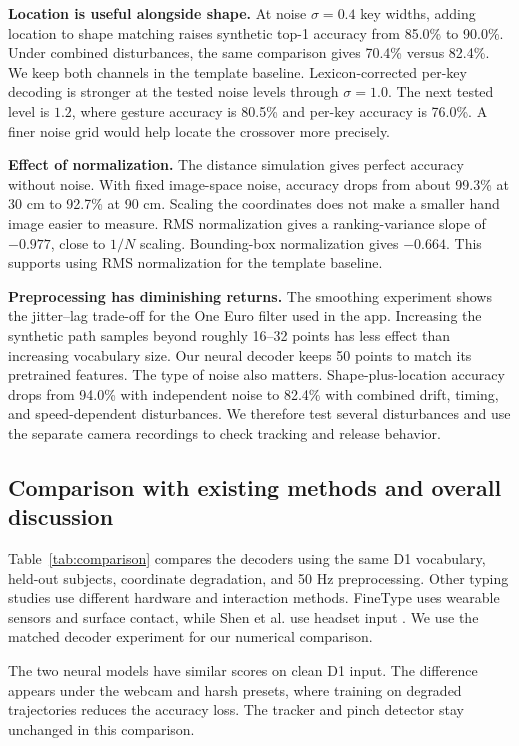 \documentclass[preprint,12pt]{elsarticle}
\begin{document}
\textbf{Location is useful alongside shape.} At noise $\sigma=0.4$ key widths, adding location to shape matching raises synthetic top-1 accuracy from 85.0\% to 90.0\%. Under combined disturbances, the same comparison gives 70.4\% versus 82.4\%. We keep both channels in the template baseline. Lexicon-corrected per-key decoding is stronger at the tested noise levels through $\sigma=1.0$. The next tested level is $1.2$, where gesture accuracy is 80.5\% and per-key accuracy is 76.0\%. A finer noise grid would help locate the crossover more precisely.

\textbf{Effect of normalization.} The distance simulation gives perfect accuracy without noise. With fixed image-space noise, accuracy drops from about 99.3\% at 30 cm to 92.7\% at 90 cm. Scaling the coordinates does not make a smaller hand image easier to measure. RMS normalization gives a ranking-variance slope of $-0.977$, close to $1/N$ scaling. Bounding-box normalization gives $-0.664$. This supports using RMS normalization for the template baseline.

\textbf{Preprocessing has diminishing returns.} The smoothing experiment shows the jitter--lag trade-off for the One Euro filter used in the app. Increasing the synthetic path samples beyond roughly 16--32 points has less effect than increasing vocabulary size. Our neural decoder keeps 50 points to match its pretrained features. The type of noise also matters. Shape-plus-location accuracy drops from 94.0\% with independent noise to 82.4\% with combined drift, timing, and speed-dependent disturbances. We therefore test several disturbances and use the separate camera recordings to check tracking and release behavior.

\subsection{Comparison with existing methods and overall discussion}
Table~\ref{tab:comparison} compares the decoders using the same D1 vocabulary, held-out subjects, coordinate degradation, and 50 Hz preprocessing. Other typing studies use different hardware and interaction methods. FineType uses wearable sensors and surface contact, while Shen et al. use headset input \cite{recent03,shen2023}. We use the matched decoder experiment for our numerical comparison.



The two neural models have similar scores on clean D1 input. The difference appears under the webcam and harsh presets, where training on degraded trajectories reduces the accuracy loss. The tracker and pinch detector stay unchanged in this comparison.
\end{document}
